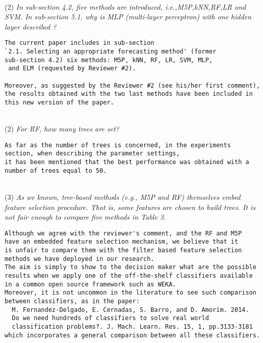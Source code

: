\documentclass[preprint]{elsarticle}
\begin{document}
~\\
\noindent (2) \emph{In sub-section 4.2, five methods are introduced, i.e.,M5P,kNN,RF,LR and SVM. In sub-section 5.1, why is MLP (multi-layer perceptron) with one hidden layer described ?} 

\begin{verbatim}
The current paper includes in sub-section 
`2.1. Selecting an appropriate forecasting method' (former
sub-section 4.2) six methods: M5P, kNN, RF, LR, SVM, MLP,
 and ELM (requested by Reviewer #2).

Moreover, as suggested by the Reviewer #2 (see his/her first comment), 
the results obtained with the two last methods have been included in 
this new version of the paper.
\end{verbatim}


~\\
\noindent (2) \emph{For RF, how many trees are set? }

\begin{verbatim}
As far as the number of trees is concerned, in the experiments 
section, when describing the parameter settings, 
it has been mentioned that the best performance was obtained with a 
number of trees equal to 50.
\end{verbatim}


~\\
\noindent (3) \emph{As we known, tree-based methods (e.g., M5P and RF) themselves embed feature selection procedure. That is, some features are chosen to build trees. It is not fair enough to compare five methods in Table 3. } 

\begin{verbatim}
Although we agree with the reviewer's comment, and the RF and M5P 
have an embedded feature selection mechanism, we believe that it 
is unfair to compare them with the filter based feature selection 
methods we have deployed in our research. 
The aim is simply to show to the decision maker what are the possible 
results when we apply one of the off-the-shelf classifiers available 
in a common open source framework such as WEKA. 
Moreover, it is not uncommon in the literature to see such comparison 
between classifiers, as in the paper:
  M. Fernandez-Delgado, E. Cernadas, S. Barro, and D. Amorim. 2014. 
  Do we need hundreds of classifiers to solve real world 
  classification problems?. J. Mach. Learn. Res. 15, 1, pp.3133-3181
which incorporates a general comparison between all these classifiers.
\end{verbatim}
\end{document}
